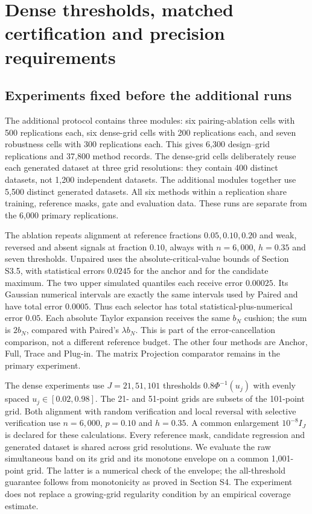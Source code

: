 \section{Dense thresholds, matched certification and precision requirements}\label{sec:s10}
\subsection{Experiments fixed before the additional runs}
The additional protocol contains three modules: six pairing-ablation cells with 500 replications each, six dense-grid cells with 200 replications each, and seven robustness cells with 300 replications each. This gives 6,300 design--grid replications and 37,800 method records. The dense-grid cells deliberately reuse each generated dataset at three grid resolutions: they contain 400 distinct datasets, not 1,200 independent datasets. The additional modules together use 5,500 distinct generated datasets. All six methods within a replication share training, reference masks, gate and evaluation data. These runs are separate from the 6,000 primary replications.

The ablation repeats alignment at reference fractions $0.05,0.10,0.20$ and weak, reversed and absent signals at fraction $0.10$, always with $n=6,000$, $h=0.35$ and seven thresholds. Unpaired uses the absolute-critical-value bounds of Section S3.5, with statistical errors $0.0245$ for the anchor and for the candidate maximum. The two upper simulated quantiles each receive error $0.00025$. Its Gaussian numerical intervals are exactly the same intervals used by Paired and have total error $0.0005$. Thus each selector has total statistical-plus-numerical error $0.05$. Each absolute Taylor expansion receives the same $b_N$ cushion; the sum is $2b_N$, compared with Paired's $\lambda b_N$. This is part of the error-cancellation comparison, not a different reference budget. The other four methods are Anchor, Full, Trace and Plug-in. The matrix Projection comparator remains in the primary experiment.

The dense experiments use $J=21,51,101$ thresholds $0.8\Phi^{-1}(u_j)$ with evenly spaced $u_j\in[0.02,0.98]$. The 21- and 51-point grids are subsets of the 101-point grid. Both alignment with random verification and local reversal with selective verification use $n=6,000$, $p=0.10$ and $h=0.35$. A common enlargement $10^{-8}I_J$ is declared for these calculations. Every reference mask, candidate regression and generated dataset is shared across grid resolutions. We evaluate the raw simultaneous band on its grid and its monotone envelope on a common 1,001-point grid. The latter is a numerical check of the envelope; the all-threshold guarantee follows from monotonicity as proved in Section S4. The experiment does not replace a growing-grid regularity condition by an empirical coverage estimate.

